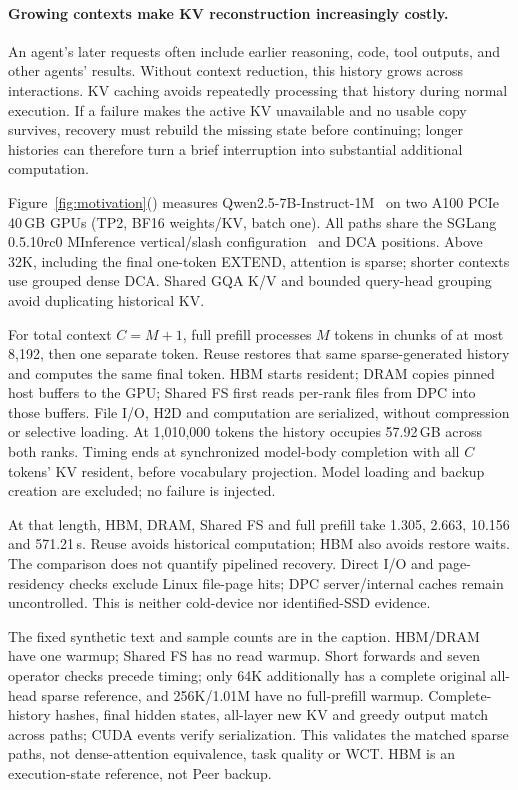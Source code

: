 \paragraph{Growing contexts make KV reconstruction increasingly costly.}
\label{sec:motivation-long-context}
An agent's later requests often include earlier reasoning, code, tool
outputs, and other agents' results. Without context reduction, this history
grows across interactions. KV caching avoids repeatedly processing that
history during normal execution. If a failure makes the active KV
unavailable and no usable copy survives, recovery must rebuild the missing
state before continuing; longer histories can therefore turn a brief
interruption into substantial additional computation.

Figure~\ref{fig:motivation}() measures
Qwen2.5-7B-Instruct-1M~\cite{qwen2025qwen25oneM} on two A100 PCIe
40\,GB GPUs (TP2, BF16 weights/KV, batch one). All paths share the
SGLang 0.5.10rc0 MInference vertical/slash configuration~\cite{jiang2024minference}
and DCA positions. Above 32K, including the final one-token EXTEND,
attention is sparse; shorter contexts use grouped dense DCA. Shared GQA
K/V and bounded query-head grouping avoid duplicating historical KV.

For total context $C=M+1$, full prefill processes $M$ tokens in chunks
of at most 8,192, then one separate token. Reuse restores that same
sparse-generated history and computes the same final token. HBM starts
resident; DRAM copies pinned host buffers to the GPU; Shared FS first
reads per-rank files from DPC into those buffers. File I/O, H2D and
computation are serialized, without compression or selective loading.
At 1,010,000 tokens the history occupies 57.92\,GB across both ranks.
Timing ends at synchronized model-body completion with all $C$ tokens'
KV resident, before vocabulary projection. Model loading and backup
creation are excluded; no failure is injected.

At that length, HBM, DRAM, Shared FS and full prefill take 1.305, 2.663,
10.156 and 571.21\,s. Reuse avoids historical computation; HBM also avoids
restore waits. The comparison does not quantify pipelined recovery.
Direct I/O and page-residency checks exclude Linux file-page hits;
DPC server/internal caches remain uncontrolled. This is neither cold-device
nor identified-SSD evidence.

The fixed synthetic text and sample counts are in the caption. HBM/DRAM
have one warmup; Shared FS has no read warmup. Short forwards and seven
operator checks precede timing; only 64K additionally has a complete
original all-head sparse reference, and 256K/1.01M have no full-prefill
warmup. Complete-history hashes, final hidden states, all-layer new KV
and greedy output match across paths; CUDA events verify serialization.
This validates the matched sparse paths, not dense-attention equivalence,
task quality or WCT. HBM is an execution-state reference, not Peer backup.

